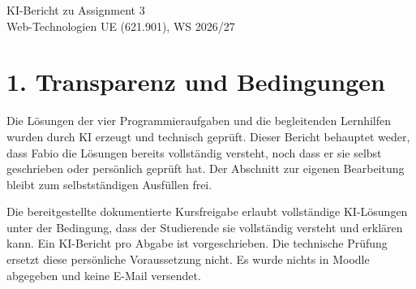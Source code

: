 \documentclass[11pt,a4paper]{article}
\begin{document}
\begin{center}
{\Large KI-Bericht zu Assignment 3}\\[4pt]
Web-Technologien UE (621.901), WS 2026/27
\end{center}

\section*{1. Transparenz und Bedingungen}
Die Lösungen der vier Programmieraufgaben und die begleitenden Lernhilfen wurden durch KI erzeugt und technisch geprüft. Dieser Bericht behauptet weder, dass Fabio die Lösungen bereits vollständig versteht, noch dass er sie selbst geschrieben oder persönlich geprüft hat. Der Abschnitt zur eigenen Bearbeitung bleibt zum selbstständigen Ausfüllen frei.

Die bereitgestellte dokumentierte Kursfreigabe erlaubt vollständige KI-Lösungen unter der Bedingung, dass der Studierende sie vollständig versteht und erklären kann. Ein KI-Bericht pro Abgabe ist vorgeschrieben. Die technische Prüfung ersetzt diese persönliche Voraussetzung nicht. Es wurde nichts in Moodle abgegeben und keine E-Mail versendet.
\end{document}
